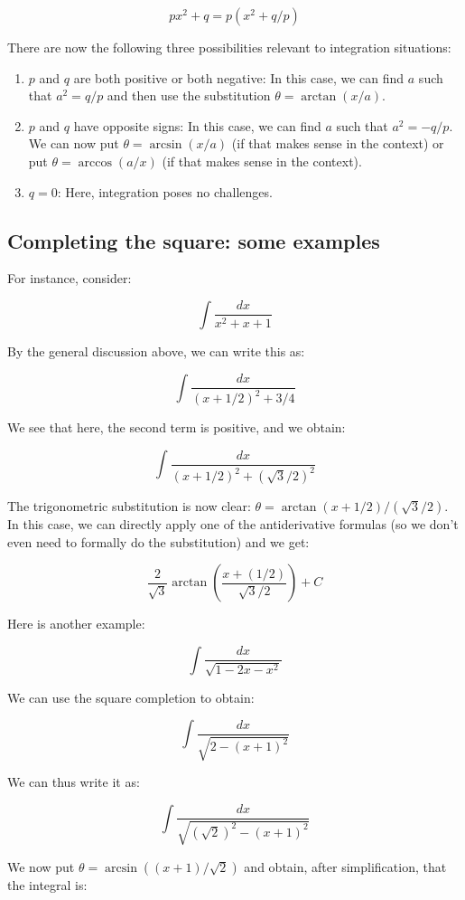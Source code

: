 \documentclass[10pt]{amsart}
\begin{document}
$$px^2 + q = p(x^2 + q/p)$$

There are now the following three possibilities relevant to
integration situations:

\begin{enumerate}
\item $p$ and $q$ are both positive or both negative: In this case, we
  can find $a$ such that $a^2 = q/p$ and then use the substitution
  $\theta = \arctan(x/a)$.
\item $p$ and $q$ have opposite signs: In this case, we can find $a$
  such that $a^2 = -q/p$. We can now put $\theta = \arcsin(x/a)$ (if
  that makes sense in the context) or put $\theta = \arccos(a/x)$ (if
  that makes sense in the context).
\item $q = 0$: Here, integration poses no challenges.
\end{enumerate}

\subsection{Completing the square: some examples}

For instance, consider:

$$\int \frac{dx}{x^2 + x + 1}$$

By the general discussion above, we can write this as:

$$\int \frac{dx}{(x + 1/2)^2 + 3/4}$$

We see that here, the second term is positive, and we obtain:

$$\int \frac{dx}{(x + 1/2)^2 + (\sqrt{3}/2)^2}$$

The trigonometric substitution is now clear: $\theta = \arctan{(x +
1/2)/(\sqrt{3}/2)}$. In this case, we can directly apply one of the
antiderivative formulas (so we don't even need to formally do the
substitution) and we get:

$$\frac{2}{\sqrt{3}} \arctan\left(\frac{x + (1/2)}{\sqrt{3}/2}\right) + C$$

Here is another example:

$$\int \frac{dx}{\sqrt{1 - 2x - x^2}}$$

We can use the square completion to obtain:

$$\int \frac{dx}{\sqrt{2 - (x + 1)^2}}$$

We can thus write it as:

$$\int \frac{dx}{\sqrt{(\sqrt{2})^2 - (x + 1)^2}}$$

We now put $\theta = \arcsin((x + 1)/\sqrt{2})$ and obtain, after
simplification, that the integral is:
\end{document}
